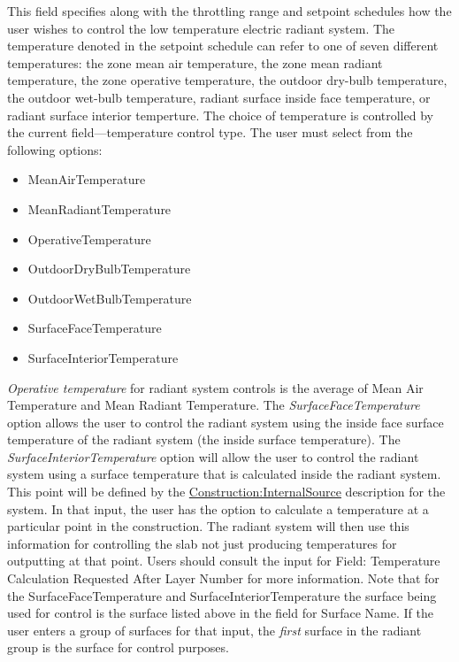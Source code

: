 This field specifies along with the throttling range and setpoint schedules how the user wishes to control the low temperature electric radiant system. The temperature denoted in the setpoint schedule can refer to one of seven different temperatures: the zone mean air temperature, the zone mean radiant temperature, the zone operative temperature, the outdoor dry-bulb temperature, the outdoor wet-bulb temperature, radiant surface inside face temperature, or radiant surface interior temperture. The choice of temperature is controlled by the current field---temperature control type. The user must select from the following options:

\begin{itemize}
\item
  MeanAirTemperature
\item
  MeanRadiantTemperature
\item
  OperativeTemperature
\item
  OutdoorDryBulbTemperature
\item
  OutdoorWetBulbTemperature
\item
  SurfaceFaceTemperature
\item
  SurfaceInteriorTemperature
\end{itemize}

\emph{Operative temperature} for radiant system controls is the average of Mean Air Temperature and Mean Radiant Temperature.  The \emph{SurfaceFaceTemperature} option allows the user to control the radiant system using the inside face surface temperature of the radiant system (the inside surface temperature).  The \emph{SurfaceInteriorTemperature} option will allow the user to control the radiant system using a surface temperature that is calculated inside the radiant system.  This point will be defined by the  \hyperref[constructioninternalsource]{Construction:InternalSource} description for the system.  In that input, the user has the option to calculate a temperature at a particular point in the construction.  The radiant system will then use this information for controlling the slab not just producing temperatures for outputting at that point.  Users should consult the input for Field: Temperature Calculation Requested After Layer Number for more information.  Note that for the SurfaceFaceTemperature and SurfaceInteriorTemperature the surface being used for control is the surface listed above in the field for Surface Name.  If the user enters a group of surfaces for that input, the \emph{first} surface in the radiant group is the surface for control purposes.

